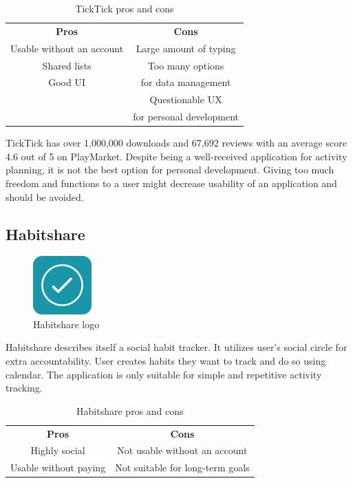 \begin{table}[h!]
    \centering
    \begin{ctucolortab}
        \begin{tabular}{cc}
            \bfseries Pros & \bfseries Cons\\\Midrule
            Usable without an account & Large amount of typing \\
            Shared lists & Too many options \\
            Good UI & for data management \\
             & Questionable UX \\
             & for personal development \\
        \end{tabular}
    \end{ctucolortab}
    \caption{TickTick pros and cons}\label{tab:ticktick-pros-cons}
\end{table}

TickTick has over 1,000,000 downloads and 67,692 reviews with an average score 4.6 out of 5 on PlayMarket.
Despite being a well-received application for activity planning, it is not the best option for personal development.
Giving too much freedom and functions to a user might decrease usability of an application and should be avoided.


\subsection{Habitshare}\label{subsec:habitshare}

\begin{figure}[h!]
    \includegraphics[width=0.20\textwidth]{images/habitshare-logo}
    \caption{Habitshare logo~\cite{habitshare-logo}}
    \label{fig:habitshare-logo}
\end{figure}

Habitshare describes itself a social habit tracker.
It utilizes user's social circle for extra accountability.
User creates habits they want to track and do so using calendar.
The application is only suitable for simple and repetitive activity tracking.

\begin{table}[h!]
    \centering
    \begin{ctucolortab}
        \begin{tabular}{cc}
            \bfseries Pros & \bfseries Cons\\\Midrule
            Highly social & Not usable without an account\\
            Usable without paying & Not suitable for long-term goals\\
        \end{tabular}
    \end{ctucolortab}
    \caption{Habitshare pros and cons}\label{tab:habitshare-pros-cons}
\end{table}

